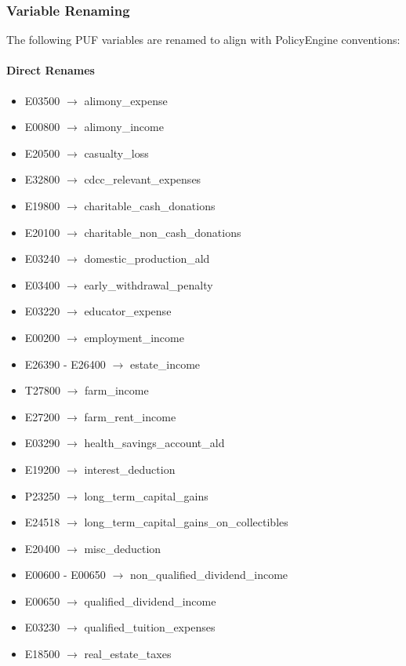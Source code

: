 \subsubsection{Variable Renaming}

The following PUF variables are renamed to align with PolicyEngine conventions:

\paragraph{Direct Renames}
\begin{itemize}
    \item E03500 $\rightarrow$ alimony\_expense
    \item E00800 $\rightarrow$ alimony\_income
    \item E20500 $\rightarrow$ casualty\_loss
    \item E32800 $\rightarrow$ cdcc\_relevant\_expenses
    \item E19800 $\rightarrow$ charitable\_cash\_donations
    \item E20100 $\rightarrow$ charitable\_non\_cash\_donations
    \item E03240 $\rightarrow$ domestic\_production\_ald
    \item E03400 $\rightarrow$ early\_withdrawal\_penalty
    \item E03220 $\rightarrow$ educator\_expense
    \item E00200 $\rightarrow$ employment\_income
    \item E26390 - E26400 $\rightarrow$ estate\_income
    \item T27800 $\rightarrow$ farm\_income
    \item E27200 $\rightarrow$ farm\_rent\_income
    \item E03290 $\rightarrow$ health\_savings\_account\_ald
    \item E19200 $\rightarrow$ interest\_deduction
    \item P23250 $\rightarrow$ long\_term\_capital\_gains
    \item E24518 $\rightarrow$ long\_term\_capital\_gains\_on\_collectibles
    \item E20400 $\rightarrow$ misc\_deduction
    \item E00600 - E00650 $\rightarrow$ non\_qualified\_dividend\_income
    \item E00650 $\rightarrow$ qualified\_dividend\_income
    \item E03230 $\rightarrow$ qualified\_tuition\_expenses
    \item E18500 $\rightarrow$ real\_estate\_taxes
\end{itemize}


